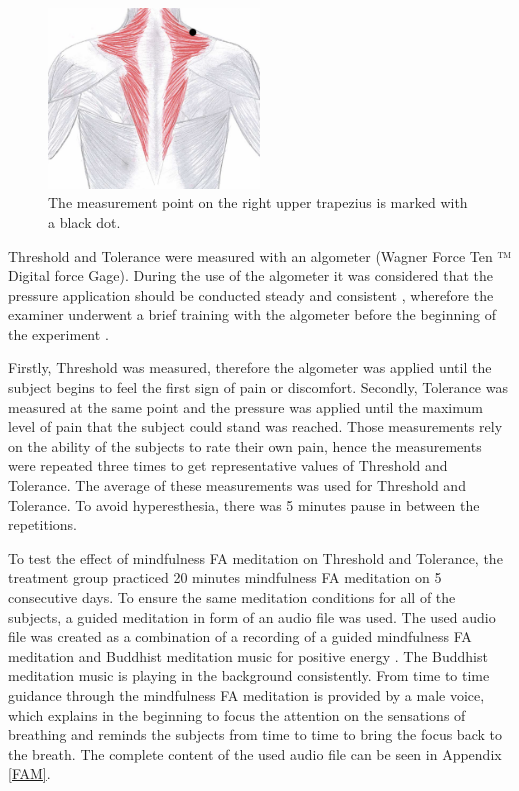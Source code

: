 \begin{figure}[H]
	\includegraphics[width=0.5\textwidth]{figures/trapezius} 
	\caption{The measurement point on the right upper trapezius is marked with a black dot.}
	\label{fig:trapezius}  
\end{figure}  

Threshold and Tolerance were measured with an algometer (Wagner Force Ten ™  Digital force Gage). During the use of the algometer it was considered that the pressure application should be conducted steady and consistent \cite{Fischer1987, Kinser2009}, wherefore the examiner underwent a brief training with the algometer before the beginning of the experiment \cite{ Kinser2009, Vaughan2007}. 

Firstly, Threshold was measured, therefore the algometer was applied until the subject begins to feel the first sign of pain or discomfort. Secondly, Tolerance was measured at the same point and the pressure was applied until the maximum level of pain that the subject could stand was reached. Those measurements rely on the ability of the subjects to rate their own pain, hence the measurements were repeated three times to get representative values of Threshold and Tolerance. The average of these measurements was used for Threshold and Tolerance. To avoid hyperesthesia, there was 5 minutes pause in between the repetitions. 

To test the effect of mindfulness FA meditation on Threshold and Tolerance, the treatment group practiced 20 minutes mindfulness FA meditation on 5 consecutive days. To ensure the same meditation conditions for all of the subjects, a guided meditation in form of an audio file was used. The used audio file was created as a combination of a recording of a guided mindfulness FA meditation \cite{Noyce2018} and Buddhist meditation music for positive energy \cite{BuddhistMusic}. The Buddhist meditation music is playing in the background consistently. From time to time guidance through the mindfulness FA meditation is provided by a male voice, which explains in the beginning to focus the attention on the sensations of breathing and reminds the subjects from time to time to bring the focus back to the breath. The complete content of the used audio file can be seen in Appendix \ref{FAM}.

